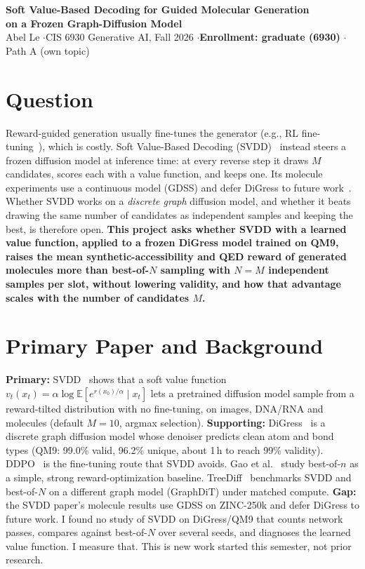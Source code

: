 \documentclass[10pt]{article}
\begin{document}
\begin{center}
{\Large\bfseries Soft Value-Based Decoding for Guided Molecular Generation\\[-1pt] on a Frozen Graph-Diffusion Model}\\[3pt]
Abel Le \quad$\cdot$\quad CIS 6930 Generative AI, Fall 2026 \quad$\cdot$\quad \textbf{Enrollment: graduate (6930)} \quad$\cdot$\quad Path A (own topic)
\end{center}
\vspace{-4pt}

\section{Question}
Reward-guided generation usually fine-tunes the generator (e.g., RL fine-tuning~\cite{black2024ddpo}), which is costly. Soft Value-Based Decoding (SVDD)~\cite{li2024svdd} instead steers a frozen diffusion model at inference time: at every reverse step it draws $M$ candidates, scores each with a value function, and keeps one. Its molecule experiments use a continuous model (GDSS) and defer DiGress to future work~\cite[App.~C]{li2024svdd}. Whether SVDD works on a \emph{discrete graph} diffusion model, and whether it beats drawing the same number of candidates as independent samples and keeping the best, is therefore open.
\textbf{This project asks whether SVDD with a learned value function, applied to a frozen DiGress model trained on QM9, raises the mean synthetic-accessibility and QED reward of generated molecules more than best-of-$N$ sampling with $N{=}M$ independent samples per slot, without lowering validity, and how that advantage scales with the number of candidates $M$.}

\section{Primary Paper and Background}
\textbf{Primary:} SVDD~\cite{li2024svdd} shows that a soft value function $v_t(x_t)=\alpha\log\mathbb{E}[e^{r(x_0)/\alpha}\mid x_t]$ lets a pretrained diffusion model sample from a reward-tilted distribution with no fine-tuning, on images, DNA/RNA and molecules (default $M{=}10$, argmax selection).
\textbf{Supporting:} DiGress~\cite{vignac2023digress} is a discrete graph diffusion model whose denoiser predicts clean atom and bond types (QM9: 99.0\% valid, 96.2\% unique, about 1\,h to reach 99\% validity). DDPO~\cite{black2024ddpo} is the fine-tuning route that SVDD avoids. Gao et al.~\cite{gao2023overopt} study best-of-$n$ as a simple, strong reward-optimization baseline. TreeDiff~\cite{zhao2026treediff} benchmarks SVDD and best-of-$N$ on a different graph model (GraphDiT) under matched compute.
\textbf{Gap:} the SVDD paper's molecule results use GDSS on ZINC-250k and defer DiGress to future work. I found no study of SVDD on DiGress/QM9 that counts network passes, compares against best-of-$N$ over several seeds, and diagnoses the learned value function. I measure that. This is new work started this semester, not prior research.
\end{document}

